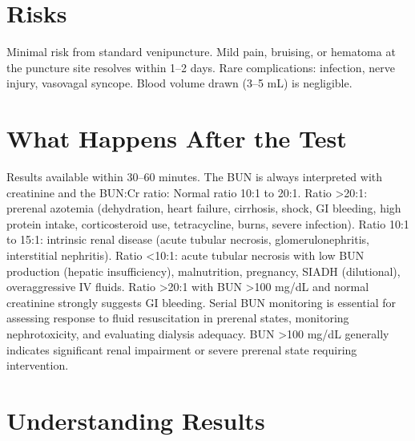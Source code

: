 \section*{Risks}
Minimal risk from standard venipuncture. Mild pain, bruising, or hematoma at the puncture site resolves within 1--2 days. Rare complications: infection, nerve injury, vasovagal syncope. Blood volume drawn (3--5 mL) is negligible.

\section*{What Happens After the Test}
Results available within 30--60 minutes. The BUN is always interpreted with creatinine and the BUN:Cr ratio: Normal ratio 10:1 to 20:1. Ratio >20:1: prerenal azotemia (dehydration, heart failure, cirrhosis, shock, GI bleeding, high protein intake, corticosteroid use, tetracycline, burns, severe infection). Ratio 10:1 to 15:1: intrinsic renal disease (acute tubular necrosis, glomerulonephritis, interstitial nephritis). Ratio <10:1: acute tubular necrosis with low BUN production (hepatic insufficiency), malnutrition, pregnancy, SIADH (dilutional), overaggressive IV fluids. Ratio >20:1 with BUN >100 mg/dL and normal creatinine strongly suggests GI bleeding. Serial BUN monitoring is essential for assessing response to fluid resuscitation in prerenal states, monitoring nephrotoxicity, and evaluating dialysis adequacy. BUN >100 mg/dL generally indicates significant renal impairment or severe prerenal state requiring intervention.

\section*{Understanding Results}

